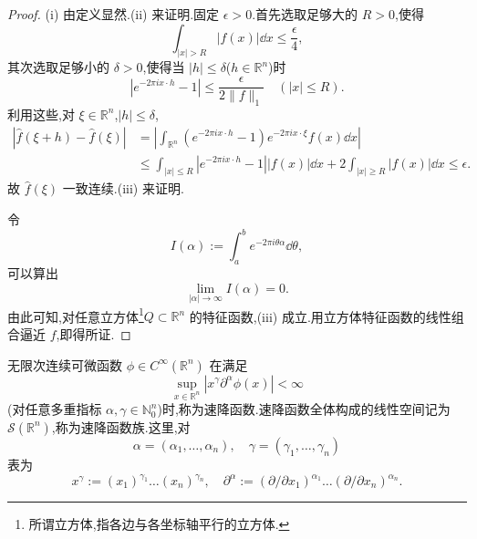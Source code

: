 \begin{proof}
(i) 由定义显然.(ii) 来证明.固定 $\epsilon > 0$.首先选取足够大的 $R > 0$,使得
\begin{equation*}
\int_{|x| > R}|f(x)|\dd x \leq \frac{\epsilon}{4},
\end{equation*}
其次选取足够小的 $\delta > 0$,使得当 $|h| \leq \delta$($h \in \mathbb{R}^{n}$)时
\begin{equation*}
\left|e^{-2\pi i x\cdot h} - 1\right| \leq \frac{\epsilon}{2\|f\|_{1}} \quad (|x| \leq R).
\end{equation*}
利用这些,对 $\xi \in \mathbb{R}^{n}$,$|h| \leq \delta$,
\begin{equation}
\begin{aligned}
|\hat{f}(\xi + h) - \hat{f}(\xi)| & = \left|\int_{\mathbb{R}^{n}}\left(e^{-2\pi i x\cdot h} - 1\right)e^{-2\pi i x\cdot\xi}f(x)\dd x\right| \\
& \leq \int_{|x| \leq R}\left|e^{-2\pi i x\cdot h} - 1\right||f(x)|\dd x + 2\int_{|x| \geq R}|f(x)|\dd x \leq \epsilon.
\end{aligned}
\end{equation}
故 $\hat{f}(\xi)$ 一致连续.(iii) 来证明.

令
\begin{equation*}
I(\alpha) := \int_{a}^{b}e^{-2\pi i\theta\alpha}\dd\theta,
\end{equation*}
可以算出
\begin{equation*}
\lim_{|\alpha| \to \infty}I(\alpha) = 0.
\end{equation*}
由此可知,对任意立方体\footnote{所谓立方体,指各边与各坐标轴平行的立方体.}$Q \subset \mathbb{R}^{n}$ 的特征函数,(iii) 成立.用立方体特征函数的线性组合逼近 $f$,即得所证.
\end{proof}

\begin{definition}[速降函数]\label{def:4.3.2}
无限次连续可微函数 $\phi \in C^{\infty}(\mathbb{R}^{n})$ 在满足
\begin{equation}
\sup_{x \in \mathbb{R}^{n}}\left|x^{\gamma}\partial^{\alpha}\phi(x)\right| < \infty\tag{4.3.2}
\label{eq:4.3.2}\end{equation}
(对任意多重指标 $\alpha, \gamma \in \mathbb{N}_{0}^{n}$)时,称为速降函数.速降函数全体构成的线性空间记为 $\mathcal{S}(\mathbb{R}^{n})$,称为速降函数族.这里,对
\begin{equation*}
\alpha = (\alpha_{1}, \ldots, \alpha_{n}), \quad \gamma = (\gamma_{1}, \ldots, \gamma_{n})
\end{equation*}
表为
\begin{equation*}
x^{\gamma} := (x_{1})^{\gamma_{1}}\ldots(x_{n})^{\gamma_{n}}, \quad \partial^{\alpha} := (\partial/\partial x_{1})^{\alpha_{1}}\ldots(\partial/\partial x_{n})^{\alpha_{n}}.
\end{equation*}
\end{definition}

